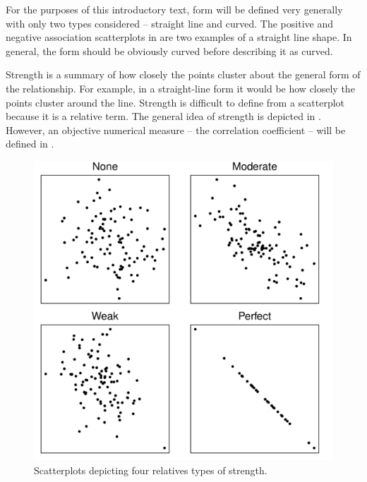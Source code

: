 \documentclass[10pt,openany]{book}\usepackage[]{graphicx}\usepackage[]{color}
\newenvironment{knitrout}{}{} %
\begin{document}

\vspace{-12pt}

\vspace{-12pt}

For the purposes of this introductory text, form will be defined very generally with only two types considered -- straight line and curved.  The positive and negative association scatterplots in  are two examples of a straight line shape.  In general, the form should be obviously curved before describing it as curved.

Strength is a summary of how closely the points cluster about the general form of the relationship.  For example, in a straight-line form it would be how closely the points cluster around the line.  Strength is difficult to define from a scatterplot because it is a relative term.  The general idea of strength is depicted in .  However, an objective numerical measure -- the correlation coefficient -- will be defined in .

\begin{knitrout}
\color{fgcolor}\begin{figure}[hbtp]

{\centering \includegraphics[width=.8\linewidth]{Figs/corrstrength1-1} 

}

\caption[Scatterplots depicting four relatives types of strength]{Scatterplots depicting four relatives types of strength.}\label{fig:corrstrength1}
\end{figure}


\end{knitrout}
\end{document}
